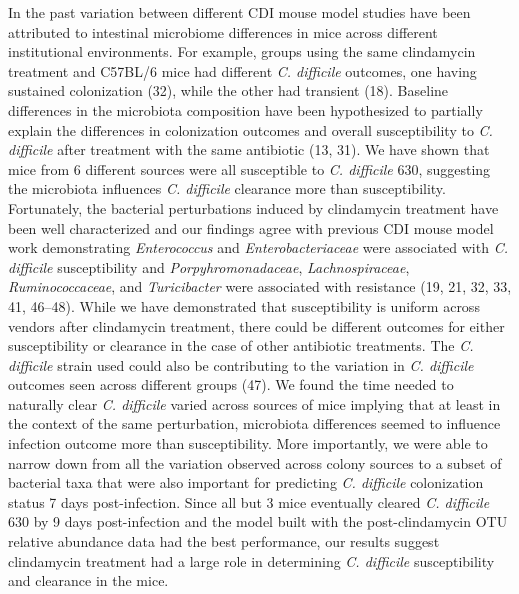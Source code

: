 \documentclass[11pt,]{article}
\begin{document}
In the past variation between different CDI mouse model studies have
been attributed to intestinal microbiome differences in mice across
different institutional environments. For example, groups using the same
clindamycin treatment and C57BL/6 mice had different \emph{C. difficile}
outcomes, one having sustained colonization (32), while the other had
transient (18). Baseline differences in the microbiota composition have
been hypothesized to partially explain the differences in colonization
outcomes and overall susceptibility to \emph{C. difficile} after
treatment with the same antibiotic (13, 31). We have shown that mice
from 6 different sources were all susceptible to \emph{C. difficile}
630, suggesting the microbiota influences \emph{C. difficile} clearance
more than susceptibility. Fortunately, the bacterial perturbations
induced by clindamycin treatment have been well characterized and our
findings agree with previous CDI mouse model work demonstrating
\emph{Enterococcus} and \emph{Enterobacteriaceae} were associated with
\emph{C. difficile} susceptibility and \emph{Porpyhromonadaceae},
\emph{Lachnospiraceae}, \emph{Ruminococcaceae}, and \emph{Turicibacter}
were associated with resistance (19, 21, 32, 33, 41, 46--48). While we
have demonstrated that susceptibility is uniform across vendors after
clindamycin treatment, there could be different outcomes for either
susceptibility or clearance in the case of other antibiotic treatments.
The \emph{C. difficile} strain used could also be contributing to the
variation in \emph{C. difficile} outcomes seen across different groups
(47). We found the time needed to naturally clear \emph{C. difficile}
varied across sources of mice implying that at least in the context of
the same perturbation, microbiota differences seemed to influence
infection outcome more than susceptibility. More importantly, we were
able to narrow down from all the variation observed across colony
sources to a subset of bacterial taxa that were also important for
predicting \emph{C. difficile} colonization status 7 days
post-infection. Since all but 3 mice eventually cleared \emph{C.
difficile} 630 by 9 days post-infection and the model built with the
post-clindamycin OTU relative abundance data had the best performance,
our results suggest clindamycin treatment had a large role in
determining \emph{C. difficile} susceptibility and clearance in the
mice.
\end{document}
